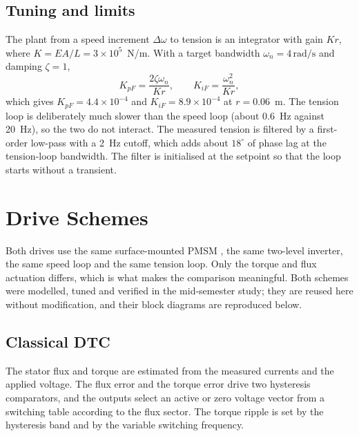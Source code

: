 \documentclass[12pt,a4paper,onecolumn]{IEEEtran}
\newcommand{\rads}{\,\mathrm{rad/s}}
\begin{document}
\subsection{Tuning and limits}
The plant from a speed increment $\Delta\omega$ to tension is an integrator with gain $Kr$, where $K=EA/L=3\times10^5$~N/m. With a target bandwidth $\omega_n=4\rads$ and damping $\zeta=1$,
\begin{equation}
K_{pF}=\frac{2\zeta\omega_n}{Kr},\qquad K_{iF}=\frac{\omega_n^2}{Kr}, \label{eq:tune}
\end{equation}
which gives $K_{pF}=4.4\times10^{-4}$ and $K_{iF}=8.9\times10^{-4}$ at $r=0.06$~m. The tension loop is deliberately much slower than the speed loop (about 0.6~Hz against 20~Hz), so the two do not interact. The measured tension is filtered by a first-order low-pass with a 2~Hz cutoff, which adds about $18^\circ$ of phase lag at the tension-loop bandwidth. The filter is initialised at the setpoint so that the loop starts without a transient.

\section{Drive Schemes}\label{sec:drives}
Both drives use the same surface-mounted PMSM \cite{pillay1989}, the same two-level inverter, the same speed loop and the same tension loop. Only the torque and flux actuation differs, which is what makes the comparison meaningful. Both schemes were modelled, tuned and verified in the mid-semester study; they are reused here without modification, and their block diagrams are reproduced below.

\subsection{Classical DTC}
The stator flux and torque are estimated from the measured currents and the applied voltage. The flux error and the torque error drive two hysteresis comparators, and the outputs select an active or zero voltage vector from a switching table according to the flux sector. The torque ripple is set by the hysteresis band and by the variable switching frequency.
\end{document}
